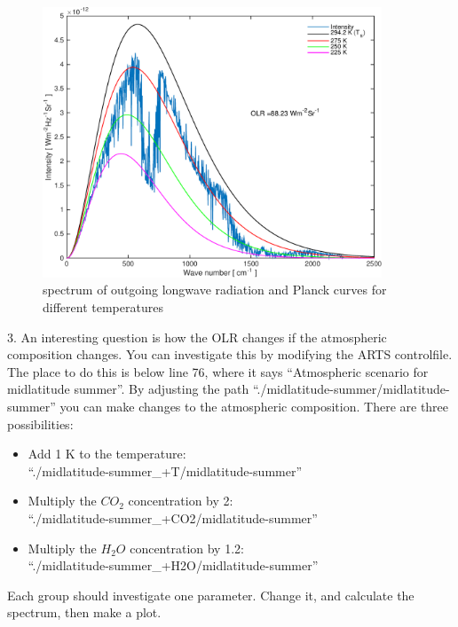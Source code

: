\documentclass[paper=a4, fontsize=11pt]{scrartcl} %
\begin{document}
\begin{figure}[h]
\centering
	\includegraphics[width=0.9\textwidth]{plots/olr.pdf}
	\caption{spectrum of outgoing longwave radiation and Planck curves for different temperatures}
\end{figure}

3. An interesting question is how the OLR changes if the atmospheric composition changes. 
You can investigate this by modifying the ARTS controlfile. The place to do this 
is below line 76, where it says “Atmospheric scenario for midlatitude summer”. 
By adjusting the path ``./midlatitude-summer/midlatitude-summer'' 
you can make changes to the atmospheric composition. There are three possibilities:
\begin{itemize}
	\item Add 1 K to the temperature: \\ ``./midlatitude-summer\_+T/midlatitude-summer''
	\item Multiply the $CO_{2}$ concentration by 2: \\ ``./midlatitude-summer\_+CO2/midlatitude-summer''
	\item Multiply the $H_{2}O$ concentration by 1.2: \\ ``./midlatitude-summer\_+H2O/midlatitude-summer'' \ \\
\end{itemize}

Each group should investigate one parameter. Change it, and calculate the spectrum, then make a plot. 
\end{document}
